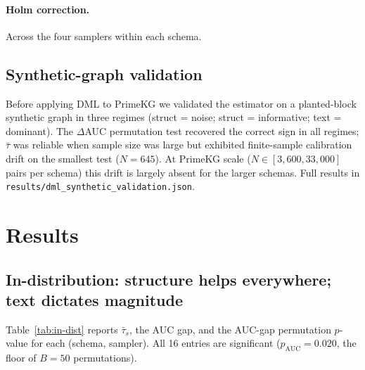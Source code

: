 \documentclass[11pt]{article}
\begin{document}
\paragraph{Holm correction.} Across the four samplers within each schema.

\subsection{Synthetic-graph validation}
Before applying DML to PrimeKG we validated the estimator on a planted-block synthetic graph in three regimes (struct = noise; struct = informative; text = dominant). The $\Delta$AUC permutation test recovered the correct sign in all regimes; $\bar\tau$ was reliable when sample size was large but exhibited finite-sample calibration drift on the smallest test ($N=645$). At PrimeKG scale ($N \in [3{,}600, 33{,}000]$ pairs per schema) this drift is largely absent for the larger schemas. Full results in \texttt{results/dml\_synthetic\_validation.json}.

\section{Results}
\label{sec:results}

\subsection{In-distribution: structure helps everywhere; text dictates magnitude}
\label{sec:in-dist}

Table~\ref{tab:in-dist} reports $\bar\tau_s$, the AUC gap, and the AUC-gap permutation $p$-value for each (schema, sampler). All 16 entries are significant ($p_{\mathrm{AUC}} = 0.020$, the floor of $B=50$ permutations).
\end{document}

